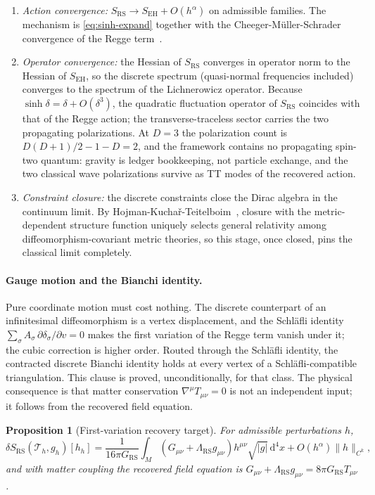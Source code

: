 \documentclass[11pt,letterpaper]{article}
\newtheorem{proposition}[theorem]{Proposition}
\theoremstyle{definition}
\newcommand{\RS}{\mathrm{RS}}
\newcommand{\EH}{\mathrm{EH}}
\newcommand{\dd}{\mathrm{d}}
\begin{document}
\begin{enumerate}[nosep]
\item \emph{Action convergence:} $S_\RS\to S_\EH+O(h^\alpha)$ on
admissible families.  The mechanism is
\eqref{eq:sinh-expand} together with the Cheeger-M\"uller-Schrader
convergence of the Regge term~\cite{CheegerMullerSchrader1984}.
\item \emph{Operator convergence:} the Hessian of $S_\RS$ converges in
operator norm to the Hessian of $S_\EH$, so the discrete spectrum
(quasi-normal frequencies included) converges to the spectrum of the
Lichnerowicz operator.  Because $\sinh\delta=\delta+O(\delta^3)$, the
quadratic fluctuation operator of $S_\RS$ coincides with that of the
Regge action; the transverse-traceless sector carries the two
propagating polarizations.  At $D=3$ the polarization count is
$D(D{+}1)/2-1-D=2$, and the framework contains no propagating spin-two
quantum: gravity is ledger bookkeeping, not particle exchange, and the
two classical wave polarizations survive as TT modes of the recovered
action.
\item \emph{Constraint closure:} the discrete constraints close the
Dirac algebra in the continuum limit.  By
Hojman-Kucha\v{r}-Teitelboim~\cite{HojmanKucharTeitelboim1976},
closure with the metric-dependent structure function uniquely selects
general relativity among diffeomorphism-covariant metric theories, so
this stage, once closed, pins the classical limit completely.
\end{enumerate}

\paragraph{Gauge motion and the Bianchi identity.}
Pure coordinate motion must cost nothing.  The discrete counterpart of
an infinitesimal diffeomorphism is a vertex displacement, and the
Schl\"afli identity $\sum_\sigma A_\sigma\,\partial\delta_\sigma/
\partial v=0$ makes the first variation of the Regge term vanish under
it; the cubic correction is higher order.  Routed through the
Schl\"afli identity, the contracted discrete Bianchi identity holds at
every vertex of a Schl\"afli-compatible triangulation.  This clause is
proved, unconditionally, for that class.  The physical consequence is
that matter conservation $\nabla^\mu T_{\mu\nu}=0$ is not an
independent input; it follows from the recovered field equation.

\begin{proposition}[First-variation recovery target]\label{thm:first-var}
For admissible perturbations $h$,
\begin{equation}\label{eq:first-var}
\delta S_\RS(\mathcal{T}_h,g_h)[h_h]
=\frac{1}{16\pi G_\RS}\int_M(G_{\mu\nu}+\Lambda_\RS g_{\mu\nu})
h^{\mu\nu}\sqrt{|g|}\,\dd^4x+O(h^\alpha)\|h\|_{C^k},
\end{equation}
and with matter coupling the recovered field equation is
$G_{\mu\nu}+\Lambda_\RS g_{\mu\nu}=8\pi G_\RS T_{\mu\nu}$.
\end{proposition}
\end{document}
